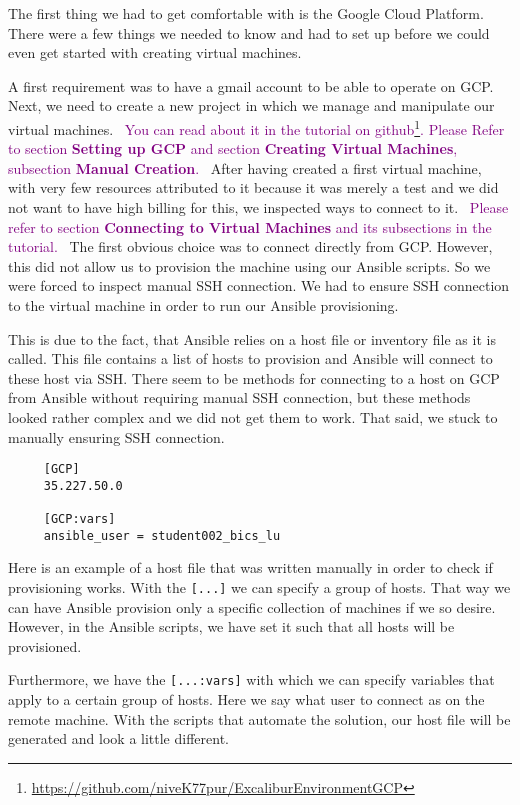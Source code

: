 The first thing we had to get comfortable with is the Google Cloud
Platform. There were a few things we needed to know and had to set up
before we could even get started with creating virtual machines.

A first requirement was to have a gmail account to be able to operate
on GCP. Next, we need to create a new project in which we manage and
manipulate our virtual machines.
\
\textcolor{purple}{You can read about it in the tutorial on
github\footnote{\url{https://github.com/niveK77pur/ExcaliburEnvironmentGCP}}.
Please Refer to section \textbf{Setting up GCP} and section
\textbf{Creating Virtual Machines}, subsection \textbf{Manual
Creation}.}
\
After having created a first virtual machine, with very few resources
attributed to it because it was merely a test and we did not want to
have high billing for this, we inspected ways to connect to it.
\
\textcolor{purple}{Please refer to section \textbf{Connecting to
Virtual Machines} and its subsections in the tutorial.}
\
The first obvious choice was to connect directly from GCP. However,
this did not allow us to provision the machine using our Ansible
scripts. So we were forced to inspect manual SSH connection. We had to
ensure SSH connection to the virtual machine in order to run our
Ansible provisioning. 

This is due to the fact, that Ansible relies on a host file or
inventory file as it is called. This file contains a list of hosts to
provision and Ansible will connect to these host via SSH. There seem
to be methods for connecting to a host on GCP from Ansible without
requiring manual SSH connection, but these methods looked rather
complex and we did not get them to work. That said, we stuck to
manually ensuring SSH connection.

\begin{verbatim}
	 [GCP]
	 35.227.50.0

	 [GCP:vars]
	 ansible_user = student002_bics_lu
\end{verbatim}

Here is an example of a host file that was written manually in order
to check if provisioning works. With the \verb|[...]| we can specify a
group of hosts. That way we can have Ansible provision only a specific
collection of machines if we so desire. However, in the Ansible
scripts, we have set it such that all hosts will be provisioned.

Furthermore, we have the \verb|[...:vars]| with which we can specify
variables that apply to a certain group of hosts. Here we say what
user to connect as on the remote machine. With the scripts that
automate the solution, our host file will be generated and look a
little different.

